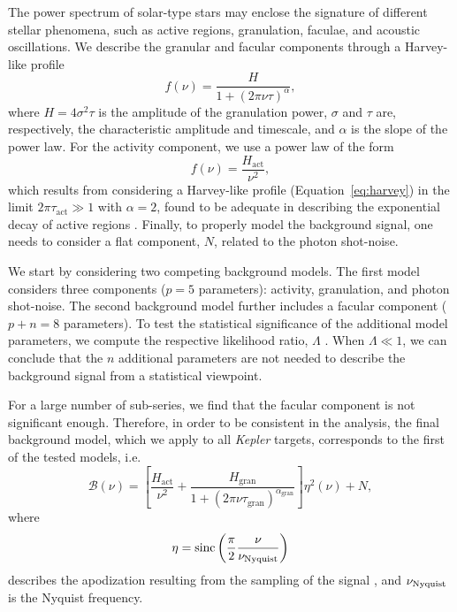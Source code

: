 \documentclass[twocolumn]{aastex61}%
\begin{document}
The power spectrum of solar-type stars may enclose the signature of different stellar phenomena, such as active regions, granulation, faculae, and acoustic oscillations.
We describe the granular and facular components through a Harvey-like profile \citep[e.g.][]{Harvey1985,Garcia2009,Mathur2011,Handberg2011,Campante2011,Karoff2012,Davies2016}
\begin{equation}
f(\nu)=\dfrac{H}{1+(2\pi\nu\tau)^\alpha},\label{eq:harvey}
\end{equation}
where $H=4\sigma^2\tau$ is the amplitude of the granulation power, $\sigma$ and $\tau$ are, respectively, the characteristic amplitude and timescale, and $\alpha$ is the slope of the power law. 
For the activity component, we use a power law of the form
\begin{equation}
f(\nu)=\dfrac{H_\text{act}}{\nu^2},
\end{equation}
which results from considering a Harvey-like profile (Equation~\ref{eq:harvey}) in the limit $2\pi\tau_\text{act}\gg1$ with $\alpha=2$, found to be adequate in describing the exponential decay of active regions \citep[e.g][]{Garcia2009,Campante2016}.
Finally, to properly model the background signal, one needs to consider a flat component, $N$, related to the photon shot-noise.

We start by considering two competing background models. The first model considers three components ($p=5$ parameters): activity, granulation, and photon shot-noise. The second background model further includes a facular component ($p+n=8$ parameters). 
To test the statistical significance of the additional model parameters, we compute the respective likelihood ratio, $\Lambda$ \citep[e.g.][]{Appourchaux1998,Karoff2012,Karoff2013}. When $\Lambda\ll1$, we can conclude that the $n$ additional parameters are not needed to describe the background signal from a statistical viewpoint.

For a large number of sub-series, we find that the facular component is not significant enough. Therefore, in order to be consistent in the analysis, the final background model, which we apply to all {\it Kepler} targets, corresponds to the first of the tested models, i.e. 
\begin{equation}
\mathcal{B}(\nu)=\left[\dfrac{H_\text{act}}{\nu^2}+\dfrac{H_\text{gran}}{1+(2\pi\nu\tau_\text{gran})^{\alpha_\text{gran}}}\right]\eta^2(\nu)+N,
\label{eq:back}\end{equation}
where
\begin{equation}
\eta={\rm sinc}\left(\dfrac{\pi}{2}\dfrac{\nu}{\nu_{\rm Nyquist}}\right)
\end{equation}
describes the apodization resulting from the sampling of the signal \citep{Chaplin2011}, and $\nu_{\rm Nyquist}$ is the Nyquist frequency.
\end{document}
